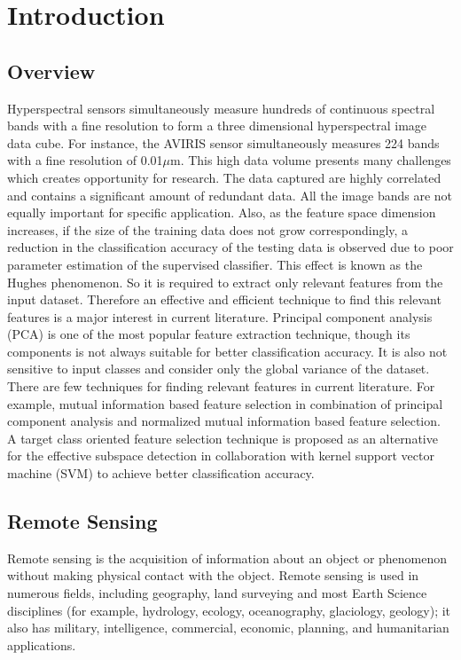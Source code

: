\documentclass[document.tex]{subfiles}
\begin{document}
	
\chapter{Introduction}

\section{Overview}
\noindent Hyperspectral sensors simultaneously measure hundreds of continuous spectral bands with a fine resolution to form a three dimensional hyperspectral image data cube. For instance, the AVIRIS sensor simultaneously measures 224 bands with a fine resolution of 0.01$\mu$m. This high data volume presents many challenges which creates opportunity for research. The data captured are highly correlated and contains a significant amount of redundant data. All the image bands are not equally important for specific application.  Also, as the feature space dimension increases, if the size of the training data does not grow correspondingly, a reduction in the classification accuracy of the testing data is observed due to poor parameter estimation of the supervised classifier. This effect is known as the Hughes phenomenon\cite{1}. So it is required to extract only relevant features from the input dataset. Therefore an effective and efficient technique to find this relevant features is a major interest in current literature. Principal component analysis (PCA)\cite{7} is one of the most popular feature extraction technique, though its components is not always suitable for better classification accuracy\cite{8}. It is also not sensitive to input classes and consider only the global variance of the dataset. There are few techniques for finding relevant features in current literature. For example, mutual information based feature selection in combination of principal component analysis\cite{10} and normalized mutual information based feature selection\cite{9}. A target class oriented feature selection technique is proposed as an alternative for the effective subspace detection in collaboration with kernel support vector machine (SVM)\cite{11} to achieve better classification accuracy.

\clearpage  

\section{Remote Sensing}
\noindent Remote sensing is the acquisition of information about an object or phenomenon without making physical contact with the object. Remote sensing is used in numerous fields, including geography, land surveying and most Earth Science disciplines (for example, hydrology, ecology, oceanography, glaciology, geology); it also has military, intelligence, commercial, economic, planning, and humanitarian applications.
\end{document}
